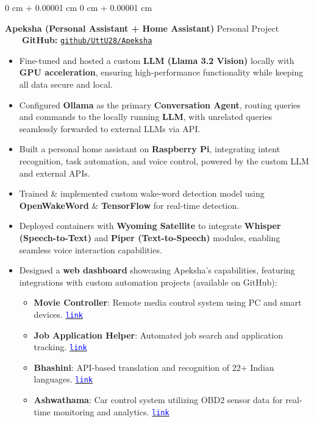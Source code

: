 \documentclass[10pt, letterpaper]{article}
\newenvironment{highlights}{
    \begin{itemize}[
        topsep=0.10 cm,
        parsep=0.10 cm,
        partopsep=0pt,
        itemsep=0pt,
        leftmargin=0 cm + 10pt
    ]
}{
    \end{itemize}
} %
\newenvironment{onecolentry}{
    \begin{adjustwidth}{
        0 cm + 0.00001 cm
    }{
        0 cm + 0.00001 cm
    }
}{
    \end{adjustwidth}
} %
\begin{document}
\begin{onecolentry}
    \textbf{Apeksha (Personal Assistant + Home Assistant)} \hfill Personal Project \ \ \ \ \textbf{GitHub:} \href{https://github.com/UttU28/Apeksha}{\texttt{github/UttU28/Apeksha}}
    \begin{highlights}
        \item Fine-tuned and hosted a custom \textbf{LLM (Llama 3.2 Vision)} locally with \textbf{GPU acceleration}, ensuring high-performance functionality while keeping all data secure and local.
        \item Configured \textbf{Ollama} as the primary \textbf{Conversation Agent}, routing queries and commands to the locally running \textbf{LLM}, with unrelated queries seamlessly forwarded to external LLMs via API.
        \item Built a personal home assistant on \textbf{Raspberry Pi}, integrating intent recognition, task automation, and voice control, powered by the custom LLM and external APIs.
        \item Trained \& implemented custom wake-word detection model using \textbf{OpenWakeWord} \& \textbf{TensorFlow} for real-time detection.
        \item Deployed containers with \textbf{Wyoming Satellite} to integrate \textbf{Whisper (Speech-to-Text)} and \textbf{Piper (Text-to-Speech)} modules, enabling seamless voice interaction capabilities.
        \item Designed a \textbf{web dashboard} showcasing Apeksha's capabilities, featuring integrations with custom automation projects (available on GitHub):
        \begin{highlights}
            \item \textbf{Movie Controller}: Remote media control system using PC and smart devices. \href{https://github.com/UttU28/Movie_Controller_2}{\textcolor{blue}{\texttt{link}}}
            \item \textbf{Job Application Helper}: Automated job search and application tracking. \href{https://github.com/UttU28/Job-Application-Helper}{\textcolor{blue}{\texttt{link}}}
            \item \textbf{Bhashini}: API-based translation and recognition of 22+ Indian languages. \href{https://github.com/UttU28/Apeksha_Frontend/}{\textcolor{blue}{\texttt{link}}}
            \item \textbf{Ashwathama}: Car control system utilizing OBD2 sensor data for real-time monitoring and analytics. \href{https://github.com/UttU28/Apeksha_Frontend/}{\textcolor{blue}{\texttt{link}}}
        \end{highlights}
        

\end{highlights}
\end{onecolentry}
\end{document}

